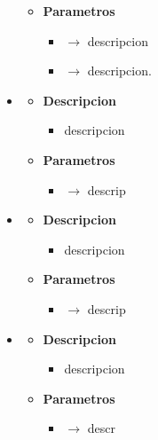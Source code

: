 \begin{itemize}
\begin{itemize}
\begin{itemize}
		\end{itemize}
        \item \textbf{Parametros}
		\begin{itemize}
			\item {} $\rightarrow$ descripcion
            \item {} $\rightarrow$ descripcion.
		\end{itemize}
	\end{itemize}
    \item{}
	\begin{itemize}
		\item \textbf{Descripcion}
        \begin{itemize}
			\item descripcion
		\end{itemize}
        \item \textbf{Parametros}
		\begin{itemize}
			\item {} $\rightarrow$ descrip
         	\end{itemize}
	\end{itemize}
    \item{}
	\begin{itemize}
		\item \textbf{Descripcion}
        \begin{itemize}
			\item descripcion
		\end{itemize}
        \item \textbf{Parametros}
		\begin{itemize}
			\item {} $\rightarrow$ descrip
         	\end{itemize}
	\end{itemize}
    \item{}
	\begin{itemize}
		\item \textbf{Descripcion}
        \begin{itemize}
			\item descripcion
		\end{itemize}
        \item \textbf{Parametros}
		\begin{itemize}
			\item {} $\rightarrow$ descr
         	\end{itemize}
	\end{itemize}

\end{itemize}
\newpage
